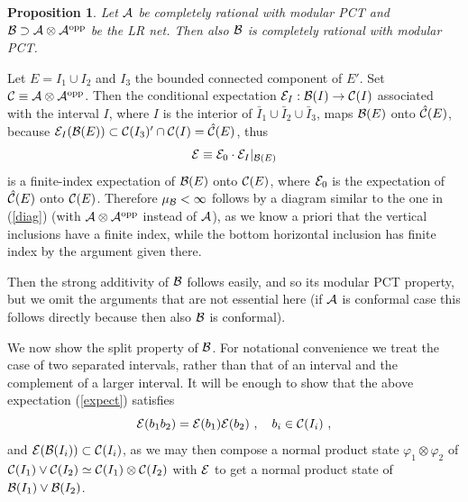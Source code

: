 \documentclass[12pt]{article}
\def\proof{\trivlist \item[\hskip \labelsep{\bf Proof\ }]}
\def\o{{\rm opp}}
\def\phi{\varphi}
\newtheorem{proposition}[theorem]{Proposition}
\def\A{{\cal A}}
\def\B{{\cal B}}
\def\E{{\cal E}}
\begin{document}
\begin{proposition}\label{c16bis} Let $\A$ be completely rational
with modular PCT and $\B\supset \A\otimes \A^\o$
be the LR net. Then also
$\B$ is completely rational with modular PCT.
\end{proposition}
\proof
Let $E=I_1\cup I_2$ and $I_3$ the bounded connected
component of $E'$. Set ${\cal C}\equiv \A\otimes \A^\o$.
Then the conditional
expectation  $\E_I:\B(I)\to{\cal C}(I)$ associated with the interval $I$,
where $I$ is the interior of
$\bar I_1\cup \bar I_2\cup \bar I_3$, maps $\B(E)$ onto
$\hat{\cal C}(E)$, because
$\E_I(\B(E))\subset {\cal C}(I_3)'\cap{\cal C}(I)=\hat{\cal C}(E)$, thus
\begin{equation}
        \E\equiv\E_0\cdot\E_I |_{\B(E)}
        \label{expect}
\end{equation}
is a finite-index expectation of $\B(E)$ onto ${\cal C}(E)$,
where $\E_0$ is the expectation of $\hat{\cal C}(E)$ onto ${\cal C}(E)$.
Therefore $\mu_{\B}<\infty$  follows by  a diagram similar to the one
in  (\ref{diag}) (with $\A\otimes\A^\o$ instead of $\A$),
as we know a priori that
the vertical inclusions have a finite index, while the bottom
horizontal inclusion has finite index by the argument given there.

Then the strong additivity of $\B$ follows easily, and so its modular 
PCT property, but we omit the arguments that are not essential here 
(if $\A$ is conformal case this follows directly because then also 
$\B$ is conformal).

We now show the split property of $\B$. For notational convenience
we treat the case of two separated intervals, rather than that of an
interval and the complement of a larger interval.
It will be enough
to show that the above expectation (\ref{expect}) satisfies
\[
\E(b_1 b_2) = \E(b_1)\E(b_2) \ ,\quad b_i\in{\cal C}(I_i) \ ,
\]
and $\E(\B(I_i))\subset {\cal C}(I_i)$, as we may then compose a normal
product state
$\phi_1\otimes\phi_2$ of ${\cal C}(I_1)\vee{\cal C}(I_2)\simeq
{\cal C}(I_1)\otimes{\cal C}(I_2)$ with $\E$ to get a normal product state of
${\cal B}(I_1)\vee{\cal B}(I_2)$.
\end{document}
